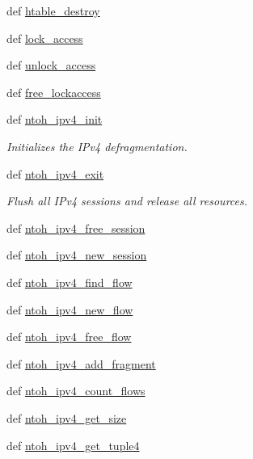 \begin{DoxyCompactItemize}
\item 
def \hyperlink{namespacelibntoh_ac9f0933e06970566c0eefd89ecb1ad4d}{htable\-\_\-destroy}
\item 
def \hyperlink{namespacelibntoh_a5a2fbad90fc1f882c0b6fce76efdf4c1}{lock\-\_\-access}
\item 
def \hyperlink{namespacelibntoh_a34e2d83b0791206e6d7bba25e2c28c7d}{unlock\-\_\-access}
\item 
def \hyperlink{namespacelibntoh_aa781dc10980a8f504f4b17879bfb25fd}{free\-\_\-lockaccess}
\item 
def \hyperlink{namespacelibntoh_aba9fb731ee41efde167deffeb7a79bd0}{ntoh\-\_\-ipv4\-\_\-init}
\begin{DoxyCompactList}\small\item\em Initializes the I\-Pv4 defragmentation. \end{DoxyCompactList}\item 
def \hyperlink{namespacelibntoh_ab056e87608725bb280228ed713d379cd}{ntoh\-\_\-ipv4\-\_\-exit}
\begin{DoxyCompactList}\small\item\em Flush all I\-Pv4 sessions and release all resources. \end{DoxyCompactList}\item 
def \hyperlink{namespacelibntoh_ae1ba03207cb4ab5e499805d44476d14e}{ntoh\-\_\-ipv4\-\_\-free\-\_\-session}
\item 
def \hyperlink{namespacelibntoh_a1be2b34836f25595287826bbea7d0ee7}{ntoh\-\_\-ipv4\-\_\-new\-\_\-session}
\item 
def \hyperlink{namespacelibntoh_a4f6b0a0caa07fd99f6e15fd6cf127226}{ntoh\-\_\-ipv4\-\_\-find\-\_\-flow}
\item 
def \hyperlink{namespacelibntoh_a5ac428789b792a4daac0972f8db83808}{ntoh\-\_\-ipv4\-\_\-new\-\_\-flow}
\item 
def \hyperlink{namespacelibntoh_a0b61fa8f2c49f353882ca66a087f8761}{ntoh\-\_\-ipv4\-\_\-free\-\_\-flow}
\item 
def \hyperlink{namespacelibntoh_ab8fcc11d5d35ef0f2681782ebe55a748}{ntoh\-\_\-ipv4\-\_\-add\-\_\-fragment}
\item 
def \hyperlink{namespacelibntoh_a6e344bcc152eb0e83465829d5324b972}{ntoh\-\_\-ipv4\-\_\-count\-\_\-flows}
\item 
def \hyperlink{namespacelibntoh_acfedc8ec47ed540383679d90996fa091}{ntoh\-\_\-ipv4\-\_\-get\-\_\-size}
\item 
def \hyperlink{namespacelibntoh_a043d53b9179d180b046f6d9b1d762bcb}{ntoh\-\_\-ipv4\-\_\-get\-\_\-tuple4}

\end{DoxyCompactItemize}
